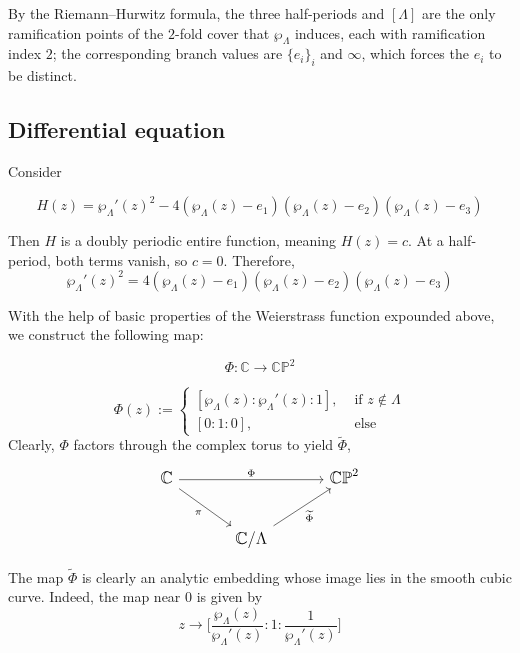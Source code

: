 \documentclass[11pt,a4paper]{article}
\begin{document}
By the Riemann--Hurwitz formula, the three half-periods and $[\Lambda]$ are the only ramification points of the $2$-fold cover that $\wp_{\Lambda}$ induces, each with ramification index $2$; the corresponding branch values are $\{e_i\}_i$ and $\infty$, which forces the $e_i$ to be distinct.

\subsection*{Differential equation} Consider

$$H(z) = \wp_{\Lambda}'(z)^2-4(\wp_{\Lambda}(z) - e_1)(\wp_{\Lambda}(z) - e_2)(\wp_{\Lambda}(z) - e_3)$$

Then $H$ is a doubly periodic entire function, meaning $H(z) = c$. At a half-period, both terms vanish, so $c=0$. Therefore,
$$\wp_{\Lambda}'(z)^2 = 4(\wp_{\Lambda}(z) - e_1)(\wp_{\Lambda}(z) - e_2)(\wp_{\Lambda}(z) - e_3)$$

With the help of basic properties of the Weierstrass function expounded above, we construct the following map:

$$\Phi : \mathbb{C} \rightarrow \mathbb{CP}^2$$


$$\Phi(z):= \begin{cases}
[\wp_{\Lambda}(z):\wp_{\Lambda}'(z):1], & \text{ if } z \notin \Lambda\\
[0:1:0], & \text{ else }
\end{cases}$$
Clearly, $\Phi$ factors through the complex torus to yield $\widetilde{\Phi}$,
\[\begin{tikzcd}[row sep=large,column sep=large,cells={nodes={font=\large}}]
	{\mathbb{C}} && {\mathbb{CP}^2} \\
	& {\mathbb{C}/\Lambda}
	\arrow["\Phi", from=1-1, to=1-3]
	\arrow["\pi"', from=1-1, to=2-2]
	\arrow["{\widetilde{\Phi}}"', from=2-2, to=1-3]
\end{tikzcd}\]

The map $\widetilde{\Phi}$ is clearly an analytic embedding whose image lies in the smooth cubic curve. Indeed, the map near $0$ is given by $$z \rightarrow \bigg[\frac{\wp_{\Lambda}(z)}{\wp_{\Lambda}'(z)}:1:\frac{1}{\wp_{\Lambda}'(z)}\bigg]$$
\end{document}
